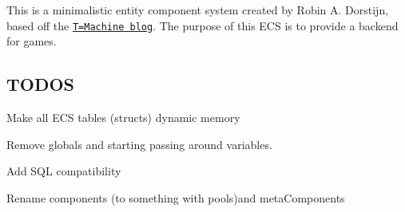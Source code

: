 This is a minimalistic entity component system created by Robin A. Dorstijn, based off the \href{http://t-machine.org}{\tt T=Machine blog}. The purpose of this E\+CS is to provide a backend for games.

\subsection*{T\+O\+D\+OS}


\begin{DoxyItemize}
\item Make all E\+CS tables (structs) dynamic memory
\item Remove globals and starting passing around variables.
\item Add S\+QL compatibility
\item Rename components (to something with pools)and meta\+Components 
\end{DoxyItemize}